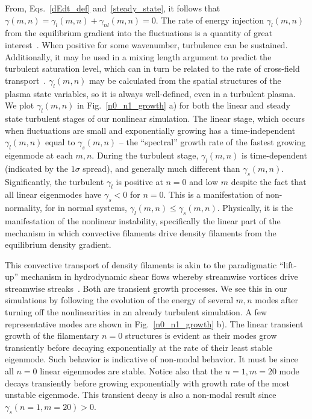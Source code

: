 \documentclass[letter,scriptaddress,twocolumn, prl,showkeys]{revtex4}
\begin{document}
From, Eqs.~\ref{dEdt_def} and~\ref{steady_state}, it follows that $ \gamma(m,n) = \gamma_l(m,n) + \gamma_{nl}(m,n) = 0$.
The rate of energy injection $\gamma_l(m,n)$ from the equilibrium gradient into the fluctuations is a quantity of great interest~\cite{friedman2012b,terry2006b}. 
When positive for some wavenumber, turbulence can be
sustained. Additionally, it may be used in a mixing length argument
to predict the turbulent saturation level, 
which can in turn be related to the rate of cross-field transport~\cite{terry2006b}. 
$\gamma_l(m,n)$ may be calculated from the spatial structures of the plasma state variables, so it is always well-defined, even in a turbulent plasma. We plot
$\gamma_l(m,n)$ in Fig.~\ref{n0_n1_growth} a) for both the linear and steady state turbulent stages of our nonlinear simulation. The linear stage, which occurs when fluctuations
are small and exponentially growing has a time-independent $\gamma_l(m,n)$ equal to $\gamma_s(m,n)$ -- the ``spectral'' growth rate of the fastest growing eigenmode at each $m,n$.
During the turbulent stage, $\gamma_l(m,n)$ is time-dependent (indicated by the $1 \sigma$ spread), and generally much different than $\gamma_s(m,n)$. Significantly,
the turbulent $\gamma_l$ is positive at $n=0$ and low $m$ despite the fact that all linear eigenmodes have $\gamma_s < 0$ for $n=0$. This is a manifestation
of non-normality, for in normal systems, $\gamma_l(m,n) \le \gamma_s(m,n)$. Physically, it is the manifestation of the nonlinear
instability, specifically the linear part of the mechanism in which convective filaments drive density filaments from the equilibrium density gradient.

This convective transport of density filaments is akin to the paradigmatic ``lift-up'' mechanism in hydrodynamic shear flows whereby streamwise vortices drive streamwise 
streaks~\cite{trefethen1993,krommes1999}.
Both are transient growth processes. We see this in our simulations by following the evolution of the energy of several $m,n$ modes after turning off the nonlinearities in an already
turbulent simulation. A few representative modes are shown in Fig.~\ref{n0_n1_growth} b). The linear transient growth of the filamentary $n=0$ structures is evident as their modes 
grow transiently before decaying exponentially at the rate of their least stable eigenmode. Such behavior is indicative of non-modal behavior. It must be since 
all $n=0$ linear eigenmodes are stable. Notice also that the $n=1,m=20$ mode decays transiently before growing exponentially with growth rate of the most unstable eigenmode. This transient
decay is also a non-modal result since $\gamma_s(n=1,m=20) > 0$.
\end{document}
